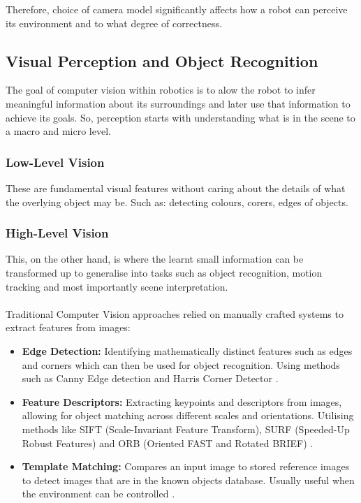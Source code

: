 Therefore, choice of camera model significantly affects how a robot can perceive its environment and to what degree of correctness. 

\subsection{Visual Perception and Object Recognition}
  The goal of computer vision within robotics is to alow the robot to infer meaningful information about its surroundings and later use that information to achieve its goals. So, perception starts with understanding what is in the scene to a macro and micro level. 
  
  \subsubsection{Low-Level Vision}
    These are fundamental visual features without caring about the details of what the overlying object may be. Such as: detecting colours, corers, edges of objects. 
  \subsubsection{High-Level Vision}
    This, on the other hand, is where the learnt small information can be transformed up to generalise into tasks such as object recognition, motion tracking and most importantly scene interpretation.
    \\\\
    Traditional Computer Vision approaches relied on manually crafted systems to extract features from images:
    \begin{itemize}
      \item \textbf{Edge Detection:} Identifying mathematically distinct features such as edges and corners \cite{marr1980theory} which can then be used for object recognition. Using methods such as Canny Edge detection \cite{canny1986computational} and Harris Corner Detector \cite{derpanis2004harris}.
      \item \textbf{Feature Descriptors:} Extracting keypoints and descriptors from images, allowing for object matching across different scales and orientations. Utilising methods like SIFT (Scale-Invariant Feature Transform), SURF (Speeded-Up Robust Features) \cite{wu2013comparative,juan2009comparison} and ORB (Oriented FAST and Rotated BRIEF) \cite{rublee2011orb}.
      \item \textbf{Template Matching:} Compares an input image to stored reference images to detect images that are in the known objects database. Usually useful when the environment can be controlled \cite{brunelli2009template}.
    \end{itemize}

